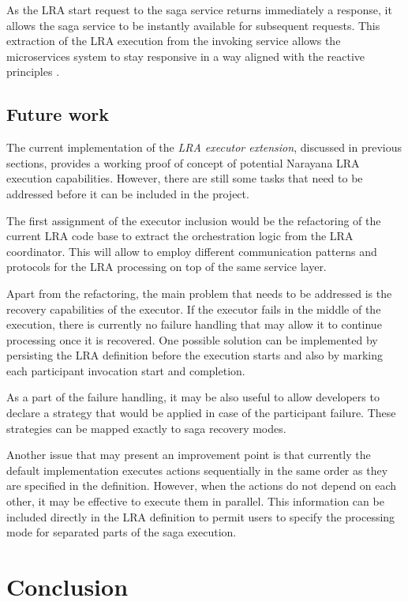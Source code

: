 \documentclass[oneside,
  digital, %
  table,   %
  lof,     %
  lot,     %
]{fithesis3}
\begin{document}
As the LRA start request to the saga service returns immediately a response, it allows the saga service to be instantly available for subsequent requests. This extraction of the LRA execution from the invoking service allows the microservices system to stay responsive in a way aligned with the reactive principles \cite{reactive_manifesto}.

\section{Future work}

The current implementation of the \textit{LRA executor extension}, discussed in previous sections, provides a working proof of concept of potential Narayana LRA execution capabilities. However, there are still some tasks that need to be addressed before it can be included in the project.

The first assignment of the executor inclusion would be the refactoring of the current LRA code base to extract the orchestration logic from the LRA coordinator. This will allow to employ different communication patterns and protocols for the LRA processing on top of the same service layer. 

Apart from the refactoring, the main problem that needs to be addressed is the recovery capabilities of the executor. If the executor fails in the middle of the execution, there is currently no failure handling that may allow it to continue processing once it is recovered. One possible solution can be implemented by persisting the LRA definition before the execution starts and also by marking each participant invocation start and completion.

As a part of the failure handling, it may be also useful to allow developers to declare a strategy that would be applied in case of the participant failure. These strategies can be mapped exactly to saga recovery modes. 

Another issue that may present an improvement point is that currently the default implementation executes actions sequentially in the same order as they are specified in the definition. However, when the actions do not depend on each other, it may be effective to execute them in parallel. This information can be included directly in the LRA definition to permit users to specify the processing mode for separated parts of the saga execution.


\clearpage
\chapter{Conclusion}
\end{document}
